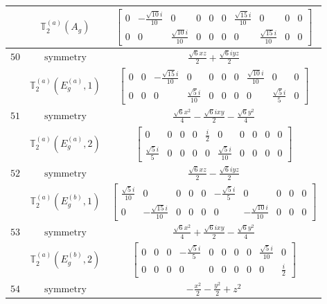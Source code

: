 \documentclass[fleqn,8pt,landscape]{jsarticle}
\begin{document}
\begin{longtable}{ccc}
$  $ & $ \mathbb{T}_{2}^{(a)}(A_{g}) $ & $ \begin{bmatrix} 0 & - \frac{\sqrt{10} i}{10} & 0 & 0 & 0 & 0 & \frac{\sqrt{15} i}{10} & 0 & 0 & 0 \\ 0 & 0 & \frac{\sqrt{10} i}{10} & 0 & 0 & 0 & 0 & \frac{\sqrt{15} i}{10} & 0 & 0 \end{bmatrix} $ \\ \hline
$ 50 $ & $ \text{symmetry} $ & $ \frac{\sqrt{6} x z}{2} + \frac{\sqrt{6} i y z}{2} $ \\
$  $ & $ \mathbb{T}_{2}^{(a)}(E_{g}^{(a)},1) $ & $ \begin{bmatrix} 0 & 0 & - \frac{\sqrt{15} i}{10} & 0 & 0 & 0 & 0 & \frac{\sqrt{10} i}{10} & 0 & 0 \\ 0 & 0 & 0 & \frac{\sqrt{5} i}{10} & 0 & 0 & 0 & 0 & \frac{\sqrt{5} i}{5} & 0 \end{bmatrix} $ \\ \hline
$ 51 $ & $ \text{symmetry} $ & $ \frac{\sqrt{6} x^{2}}{4} - \frac{\sqrt{6} i x y}{2} - \frac{\sqrt{6} y^{2}}{4} $ \\
$  $ & $ \mathbb{T}_{2}^{(a)}(E_{g}^{(a)},2) $ & $ \begin{bmatrix} 0 & 0 & 0 & 0 & \frac{i}{2} & 0 & 0 & 0 & 0 & 0 \\ \frac{\sqrt{5} i}{5} & 0 & 0 & 0 & 0 & \frac{\sqrt{5} i}{10} & 0 & 0 & 0 & 0 \end{bmatrix} $ \\ \hline
$ 52 $ & $ \text{symmetry} $ & $ \frac{\sqrt{6} x z}{2} - \frac{\sqrt{6} i y z}{2} $ \\
$  $ & $ \mathbb{T}_{2}^{(a)}(E_{g}^{(b)},1) $ & $ \begin{bmatrix} \frac{\sqrt{5} i}{10} & 0 & 0 & 0 & 0 & - \frac{\sqrt{5} i}{5} & 0 & 0 & 0 & 0 \\ 0 & - \frac{\sqrt{15} i}{10} & 0 & 0 & 0 & 0 & - \frac{\sqrt{10} i}{10} & 0 & 0 & 0 \end{bmatrix} $ \\ \hline
$ 53 $ & $ \text{symmetry} $ & $ \frac{\sqrt{6} x^{2}}{4} + \frac{\sqrt{6} i x y}{2} - \frac{\sqrt{6} y^{2}}{4} $ \\
$  $ & $ \mathbb{T}_{2}^{(a)}(E_{g}^{(b)},2) $ & $ \begin{bmatrix} 0 & 0 & 0 & - \frac{\sqrt{5} i}{5} & 0 & 0 & 0 & 0 & \frac{\sqrt{5} i}{10} & 0 \\ 0 & 0 & 0 & 0 & 0 & 0 & 0 & 0 & 0 & \frac{i}{2} \end{bmatrix} $ \\ \hline
$ 54 $ & $ \text{symmetry} $ & $ - \frac{x^{2}}{2} - \frac{y^{2}}{2} + z^{2} $ \\

\end{longtable}
\end{document}
